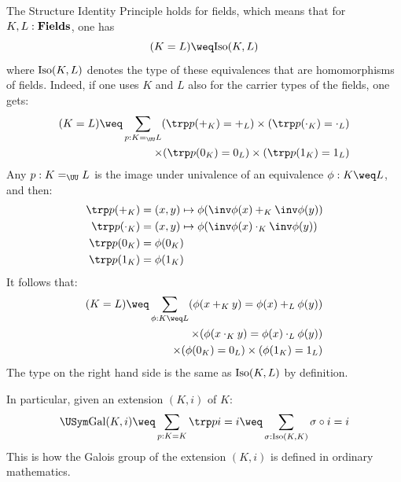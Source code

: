 \begin{remark}
  \label{rem:sip-univalence}
  The Structure Identity Principle holds for fields, which means that for
  $K,L:\mathbf{Fields}$, one has
  \begin{displaymath}
    (K = L) \weq \iso(K,L)
  \end{displaymath}
  where $\mathrm{Iso}(K,L)$ denotes the type of these equivalences that are
  homomorphisms of fields. Indeed, if one uses $K$ and $L$ also for the carrier
  types of the fields, one gets:
  \begin{displaymath}
    \begin{split}
      (K = L) \weq \sum_{p:K=_\UU L}  (\trp p (+_K) = +_L)
      \times (\trp p (\cdot_K) = \cdot_L)
      \\ \times (\trp p (0_K) = 0_L)
      \times (\trp p (1_K) = 1_L) 
    \end{split}
  \end{displaymath}
  Any $p : K =_\UU L$ is the image under univalence of an equivalence $\phi: K \weq L$, and then:
  \begin{align*}
    \trp p (+_K) &= (x,y) \mapsto \phi( \inv\phi(x) +_K \inv \phi(y)) \\
    \trp p (\cdot_K) &= (x,y) \mapsto \phi( \inv\phi(x) \cdot_K \inv \phi(y)) \\
    \trp p (0_K) &=\phi( 0_K ) \\
    \trp p (1_K) &=\phi( 1_K )
  \end{align*}
  It follows that:
  \begin{displaymath}
    \begin{split}
      (K=L) \weq \sum_{\phi: K \weq L} (\phi(x +_K y) = \phi (x) +_L \phi (y)) \\
      \times (\phi(x\cdot_K y) = \phi (x) \cdot_L \phi (y)) \\
      \times (\phi(0_K) = 0_L)
        \times (\phi(1_K) = 1_L)
    \end{split}
  \end{displaymath}
  The type on the right hand side is the same as $\mathrm{Iso}(K,L)$ by definition.

  In particular, given an extension $(K,i)$ of $K$:
  \begin{align*}
    \USym\Gal(K,i) \weq \sum_{p:K=K} \trp p i = i \weq \sum_{\sigma:\iso(K,K)} \sigma \circ i = i
  \end{align*}
  This is how the Galois group of the extension $(K,i)$ is defined in ordinary mathematics.
\end{remark}

